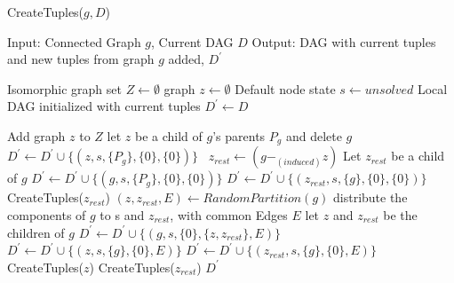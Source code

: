 \begin{algorithm}
\caption{CreateTuples($g,D$)} 
\label{alg:alg102}
\begin{algorithmic}
\STATE Input: Connected Graph $g$, Current DAG $D$
\STATE Output: DAG with current tuples and new tuples from graph $g$ added, $D^{'}$
\end{algorithmic}
\begin{algorithmic}[1]
\STATE Isomorphic graph set $Z \leftarrow \emptyset$
\STATE graph $z  \leftarrow　\emptyset$
\STATE Default node state $s  \leftarrow unsolved$
\STATE Local DAG initialized with current tuples $D^{'} \leftarrow D$

\STATE Add graph $z$ to $Z$ 
\ENDIF
\ENDFOR
{} 
\STATE let $z$ be a child of $g$'s parents $P_g$ and delete $g$
\STATE $D^{'} \leftarrow D^{'} \cup \{(z,s,\{P_g\},\{0\},\{0\})\}$
\RETURN
\ELSE
{}
\STATE \ $z_{rest}  \leftarrow  (g -_{(induced)} z)$
\STATE Let \emph{$z_{rest}$} be a child of \emph{$g$}
\STATE $D^{'}  \leftarrow D^{'} \cup \{(g,s,\{P_g\},\{0\},\{0\})\}$
\STATE $D^{'}  \leftarrow D^{'} \cup \{(z_{rest},s,\{g\},\{0\},\{0\})\}$
\STATE CreateTuples($z_{rest}$)
\RETURN
\ENDIF
\ENDFOR
\ENDIF
\ENDWHILE
{}
\STATE $(z,z_{rest},E) \leftarrow RandomPartition(g)$
\ELSE
\STATE distribute the components of $g$ to s and $z_{rest}$, with common Edges $E$
\ENDIF
\STATE let $z$ and $z_{rest}$ be the children of $g$
\STATE $D^{'}  \leftarrow D^{'} \cup \{(g,s,\{0\},\{z,z_{rest}\},E)\}$
\STATE $D^{'}  \leftarrow D^{'} \cup \{(z,s,\{g\},\{0\},E)\}$
\STATE $D^{'}  \leftarrow D^{'} \cup \{(z_{rest},s,\{g\},\{0\},E)\}$
\STATE CreateTuples($z$)
\STATE CreateTuples($z_{rest}$) 
\ENDIF
\RETURN $D^{'}$

\end{algorithmic}
\end{algorithm}


